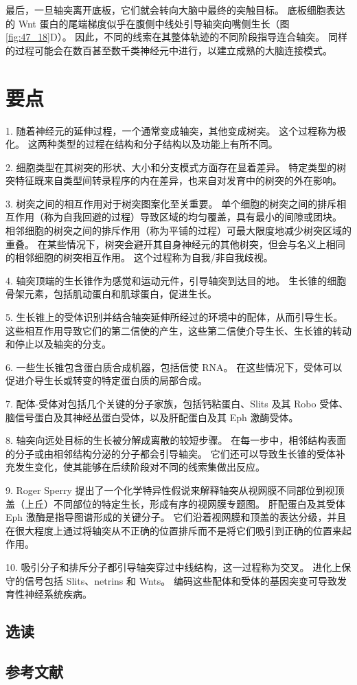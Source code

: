 最后，一旦轴突离开底板，它们就会转向大脑中最终的突触目标。 底板细胞表达的 Wnt 蛋白的尾端梯度似乎在腹侧中线处引导轴突向嘴侧生长（图 \ref{fig:47_18}D）。 因此，不同的线索在其整体轨迹的不同阶段指导连合轴突。 同样的过程可能会在数百甚至数千类神经元中进行，以建立成熟的大脑连接模式。


\section{要点}
1. 随着神经元的延伸过程，一个通常变成轴突，其他变成树突。 这个过程称为极化。 这两种类型的过程在结构和分子结构以及功能上有所不同。 

2. 细胞类型在其树突的形状、大小和分支模式方面存在显着差异。 特定类型的树突特征既来自类型间转录程序的内在差异，也来自对发育中的树突的外在影响。 

3. 树突之间的相互作用对于树突图案化至关重要。 单个细胞的树突之间的排斥相互作用（称为自我回避的过程）导致区域的均匀覆盖，具有最小的间隙或团块。 相邻细胞的树突之间的排斥作用（称为平铺的过程）可最大限度地减少树突区域的重叠。 在某些情况下，树突会避开其自身神经元的其他树突，但会与名义上相同的相邻细胞的树突相互作用。 这个过程称为自我/非自我歧视。 

4. 轴突顶端的生长锥作为感觉和运动元件，引导轴突到达目的地。 生长锥的细胞骨架元素，包括肌动蛋白和肌球蛋白，促进生长。 

5. 生长锥上的受体识别并结合轴突延伸所经过的环境中的配体，从而引导生长。 这些相互作用导致它们的第二信使的产生，这些第二信使介导生长、生长锥的转动和停止以及轴突的分支。 

6. 一些生长锥包含蛋白质合成机器，包括信使 RNA。 在这些情况下，受体可以促进介导生长或转变的特定蛋白质的局部合成。 

7. 配体-受体对包括几个关键的分子家族，包括钙粘蛋白、Slits 及其 Robo 受体、脑信号蛋白及其神经丛蛋白受体，以及肝配蛋白及其 Eph 激酶受体。 

8. 轴突向远处目标的生长被分解成离散的较短步骤。 在每一步中，相邻结构表面的分子或由相邻结构分泌的分子都会引导轴突。 它们还可以导致生长锥的受体补充发生变化，使其能够在后续阶段对不同的线索集做出反应。 

9. Roger Sperry 提出了一个化学特异性假说来解释轴突从视网膜不同部位到视顶盖（上丘）不同部位的特定生长，形成有序的视网膜专题图。 肝配蛋白及其受体 Eph 激酶是指导图谱形成的关键分子。 它们沿着视网膜和顶盖的表达分级，并且在很大程度上通过将轴突从不正确的位置排斥而不是将它们吸引到正确的位置来起作用。 

10. 吸引分子和排斥分子都引导轴突穿过中线结构，这一过程称为交叉。 进化上保守的信号包括 Slits、netrins 和 Wnts。 编码这些配体和受体的基因突变可导致发育性神经系统疾病。

\subsection{选读}
\subsection{参考文献}
